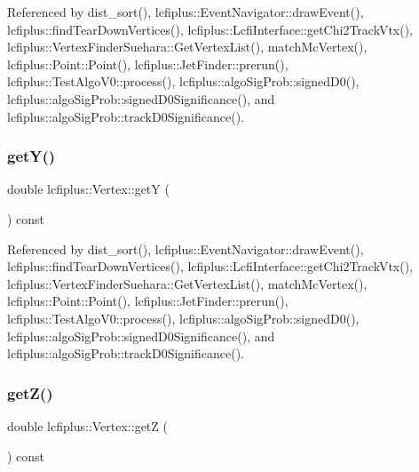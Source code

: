 Referenced by dist\+\_\+sort(), lcfiplus\+::\+Event\+Navigator\+::draw\+Event(), lcfiplus\+::find\+Tear\+Down\+Vertices(), lcfiplus\+::\+Lcfi\+Interface\+::get\+Chi2\+Track\+Vtx(), lcfiplus\+::\+Vertex\+Finder\+Suehara\+::\+Get\+Vertex\+List(), match\+Mc\+Vertex(), lcfiplus\+::\+Point\+::\+Point(), lcfiplus\+::\+Jet\+Finder\+::prerun(), lcfiplus\+::\+Test\+Algo\+V0\+::process(), lcfiplus\+::algo\+Sig\+Prob\+::signed\+D0(), lcfiplus\+::algo\+Sig\+Prob\+::signed\+D0\+Significance(), and lcfiplus\+::algo\+Sig\+Prob\+::track\+D0\+Significance().

\mbox{\label{classlcfiplus_1_1Vertex_aafb0525704bf8d69d2dda4c7c6030d66}} 
\subsubsection{get\+Y()}
{\footnotesize\ttfamily double lcfiplus\+::\+Vertex\+::getY (\begin{DoxyParamCaption}{ }\end{DoxyParamCaption}) const\hspace{0.3cm}{\ttfamily [inline]}}



Referenced by dist\+\_\+sort(), lcfiplus\+::\+Event\+Navigator\+::draw\+Event(), lcfiplus\+::find\+Tear\+Down\+Vertices(), lcfiplus\+::\+Lcfi\+Interface\+::get\+Chi2\+Track\+Vtx(), lcfiplus\+::\+Vertex\+Finder\+Suehara\+::\+Get\+Vertex\+List(), match\+Mc\+Vertex(), lcfiplus\+::\+Point\+::\+Point(), lcfiplus\+::\+Jet\+Finder\+::prerun(), lcfiplus\+::\+Test\+Algo\+V0\+::process(), lcfiplus\+::algo\+Sig\+Prob\+::signed\+D0(), lcfiplus\+::algo\+Sig\+Prob\+::signed\+D0\+Significance(), and lcfiplus\+::algo\+Sig\+Prob\+::track\+D0\+Significance().

\mbox{\label{classlcfiplus_1_1Vertex_a6d566e3d27834ba6966ed8308782686a}} 
\subsubsection{get\+Z()}
{\footnotesize\ttfamily double lcfiplus\+::\+Vertex\+::getZ (\begin{DoxyParamCaption}{ }\end{DoxyParamCaption}) const\hspace{0.3cm}{\ttfamily [inline]}}



